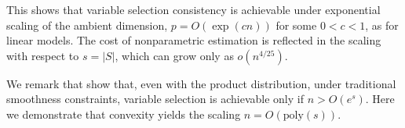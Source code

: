 This shows that variable selection consistency is achievable under
exponential scaling of the ambient dimension, $p = O(\exp(cn))$
for some $0<c<1$, as for linear models. The cost of nonparametric estimation is
reflected in the scaling with respect to $s=|S|$, which can grow only
as $o(n^{4/25})$.

We remark that \citet{dalalyan:12} show that, even with the product distribution,
 under traditional smoothness
constraints, variable selection is achievable only if $n > O(e^s)$. 
Here we demonstrate that convexity yields the scaling $n =
O(\textrm{poly}(s))$.


